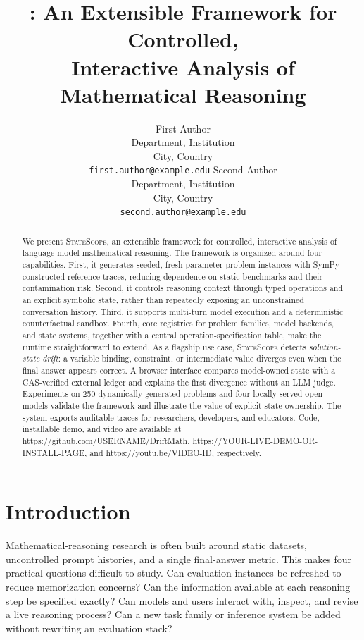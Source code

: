 \documentclass[11pt]{article}
\title{\systemname: An Extensible Framework for Controlled,\\
Interactive Analysis of Mathematical Reasoning}
\author{First Author \\
  Department, Institution \\
  City, Country \\
  \texttt{first.author@example.edu}
  \And
  Second Author \\
  Department, Institution \\
  City, Country \\
  \texttt{second.author@example.edu}}
\newcommand{\systemname}{\textsc{StateScope}}
\newcommand{\codeurl}{https://github.com/USERNAME/DriftMath}
\newcommand{\demourl}{https://YOUR-LIVE-DEMO-OR-INSTALL-PAGE}
\newcommand{\videourl}{https://youtu.be/VIDEO-ID}
\begin{document}
\maketitle

\begin{abstract}
We present \systemname, an extensible framework for controlled, interactive analysis
of language-model mathematical reasoning.  The framework is organized around four
capabilities.  First, it generates seeded, fresh-parameter problem instances with
SymPy-constructed reference traces,
reducing dependence on static benchmarks and their contamination risk.  Second, it
controls reasoning context through typed operations and an explicit symbolic state,
rather than repeatedly exposing an unconstrained conversation history.  Third, it
supports multi-turn model execution and a deterministic counterfactual sandbox.
Fourth, core registries for problem families, model backends, and state systems,
together with a central operation-specification table, make the runtime
straightforward to extend.  As a flagship use case, \systemname{} detects
\emph{solution-state drift}: a variable binding, constraint, or intermediate value
diverges even when the final answer appears correct.  A browser interface compares
model-owned state with a CAS-verified external ledger and explains the first
divergence without an LLM judge.  Experiments on 250 dynamically generated problems
and four locally served open models validate the framework and illustrate the value
of explicit state ownership.  The system exports auditable traces for researchers,
developers, and educators.
Code, installable demo, and video are available at \url{\codeurl},
\url{\demourl}, and \url{\videourl}, respectively.
\end{abstract}

\section{Introduction}

Mathematical-reasoning research is often built around static datasets, uncontrolled
prompt histories, and a single final-answer metric.  This makes four practical
questions difficult to study.  Can evaluation instances be refreshed to reduce
memorization concerns?  Can the information available at each reasoning step be
specified exactly?  Can models and users interact with, inspect, and revise a live
reasoning process?  Can a new task family or inference system be added without
rewriting an evaluation stack?
\end{document}
